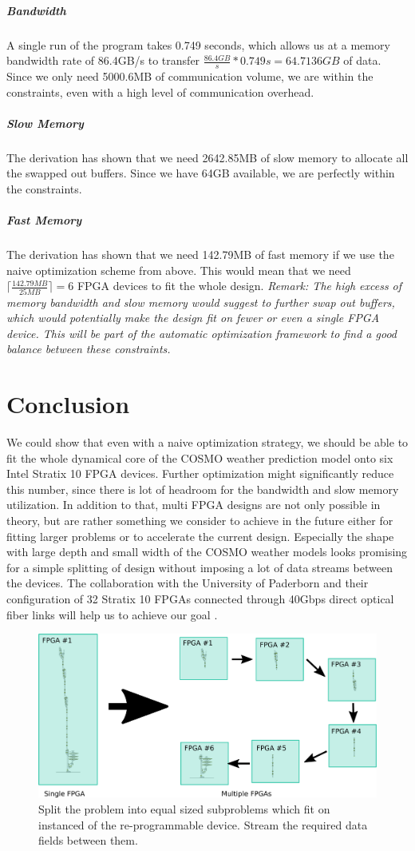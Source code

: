 \subparagraph{Bandwidth}
A single run of the program takes 0.749 seconds, which allows us at a memory bandwidth rate of 86.4GB/s to transfer $\frac{86.4GB}{s} * 0.749s = 64.7136GB$ of data. Since we only need 5000.6MB of communication volume, we are within the constraints, even with a high level of communication overhead.


\subparagraph{Slow Memory}
The derivation has shown that we need 2642.85MB of slow memory to allocate all the swapped out buffers. Since we have 64GB available, we are perfectly within the constraints.


\subparagraph{Fast Memory}
The derivation has shown that we need 142.79MB of fast memory if we use the naive optimization scheme from above. This would mean that we need $\lceil\frac{142.79MB}{25MB}\rceil = 6$ FPGA devices to fit the whole design. \textit{Remark: The high excess of memory bandwidth and slow memory would suggest to further swap out buffers, which would potentially make the design fit on fewer or even a single FPGA device. This will be part of the automatic optimization framework to find a good balance between these constraints.}


\section{Conclusion}
We could show that even with a naive optimization strategy, we should be able to fit the whole dynamical core of the COSMO weather prediction model onto six Intel Stratix 10 FPGA devices. Further optimization might significantly reduce this number, since there is lot of headroom for the bandwidth and slow memory utilization. In addition to that, multi FPGA designs are not only possible in theory, but are rather something we consider to achieve in the future either for fitting larger problems or to accelerate the current design. Especially the shape with large depth and small width of the COSMO weather models looks promising for a simple splitting of design without imposing a lot of data streams between the devices. The collaboration with the University of Paderborn and their configuration of 32 Stratix 10 FPGAs connected through 40Gbps direct optical fiber links will help us to achieve our goal \cite{label60}.
\begin{figure}[h]
	\centering
	\includegraphics[width=1.0\textwidth]{drawings/dycore-estimate-split-design-multi-fpga.png}
	\caption{Split the problem into equal sized subproblems which fit on instanced of the re-programmable device. Stream the required data fields between them.}
	\label{fig:dycore-estimate-split-design-multi-fpga}
\end{figure}
